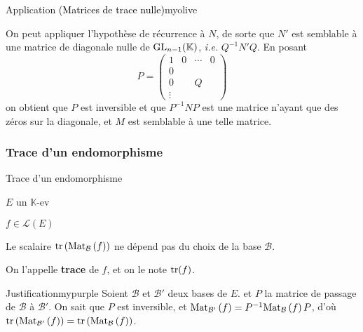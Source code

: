 \begin{omed}{Application \textcolor{black}{(Matrices de trace nulle)}}{myolive}
\begin{enumerate}
\begin{itemize}
                On peut appliquer l’hypothèse de récurrence à $N$, de sorte que $N'$ est semblable à une matrice de diagonale nulle de $\operatorname{GL}_{n-1}(\mathbb{K})$, \textit{i.e.} $Q^{-1} N' Q$. En posant 
                \[ P=\left(\begin{array}{c|ccc}
                    1&0&\cdots&0\\
                    \hline
                    0&\\
                    0&&Q\\
                    \vdots&
                    \end{array}\right) \]   
                on obtient que $P$ est inversible et que $P^{-1} N P$ est une matrice n’ayant que des zéros sur la diagonale, et $M$ est semblable à une telle matrice.
            \end{itemize}
        \end{enumerate}
    \end{omed} 

    \subsubsection{Trace d’un endomorphisme}

    \begin{defitheo}{Trace d’un endomorphisme}{}
        \begin{soit}
            \item $E$ un $\mathbb{K}$-ev
            \item $f \in \mathcal{L}(E)$
        \end{soit}
        Le scalaire $\operatorname{tr}\left(\text{Mat}_{\mathcal{B}}\left(f\right)\right)$ ne dépend pas du choix de la base $\mathcal{B}$.

        On l’appelle \textbf{trace} de $f$, et on le note $\operatorname{tr}(f)$.
    \end{defitheo}

    \begin{demo}{Justification}{mypurple}
        Soient $\mathcal{B}$ et $\mathcal{B}'$ deux bases de $E$. et $P$ la matrice de passage de $\mathcal{B}$ à $\mathcal{B}'$. On sait que $P$ est inversible, et $\text{Mat}_{\mathcal{B}'}\left(f\right) = P^{-1} \text{Mat}_{\mathcal{B}}\left(f\right) P$, d’où $\operatorname{tr}\left(\text{Mat}_{\mathcal{B}'}\left(f\right)\right) = \operatorname{tr}\left(\text{Mat}_{\mathcal{B}}\left(f\right)\right)$.
    \end{demo}

